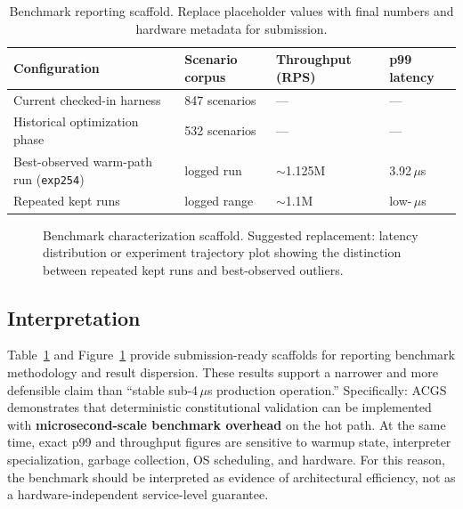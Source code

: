 \documentclass[11pt]{article}
\begin{document}
\begin{table}[t]
  \centering
  \caption{Benchmark reporting scaffold. Replace placeholder values with final numbers and hardware metadata for submission.}
  \label{tab:benchmark-summary}
  \begin{tabular}{llll}
    \toprule
    Configuration & Scenario corpus & Throughput (RPS) & p99 latency \\
    \midrule
    Current checked-in harness & 847 scenarios & --- & --- \\
    Historical optimization phase & 532 scenarios & --- & --- \\
    Best-observed warm-path run (\texttt{exp254}) & logged run & $\sim$1.125M & 3.92\,$\mu$s \\
    Repeated kept runs & logged range & $\sim$1.1M & low-\,$\mu$s \\
    \bottomrule
  \end{tabular}
\end{table}

\begin{figure}[t]
  \centering
  \caption{Benchmark characterization scaffold. Suggested replacement: latency distribution or experiment trajectory plot showing the distinction between repeated kept runs and best-observed outliers.}
  \label{fig:benchmark-characterization}
\end{figure}

\subsection{Interpretation}
Table~\ref{tab:benchmark-summary} and Figure~\ref{fig:benchmark-characterization} provide submission-ready scaffolds for reporting benchmark methodology and result dispersion. These results support a narrower and more defensible claim than ``stable sub-4\,$\mu$s production operation.'' Specifically: ACGS demonstrates that deterministic constitutional validation can be implemented with \textbf{microsecond-scale benchmark overhead} on the hot path. At the same time, exact p99 and throughput figures are sensitive to warmup state, interpreter specialization, garbage collection, OS scheduling, and hardware. For this reason, the benchmark should be interpreted as evidence of architectural efficiency, not as a hardware-independent service-level guarantee.
\end{document}
